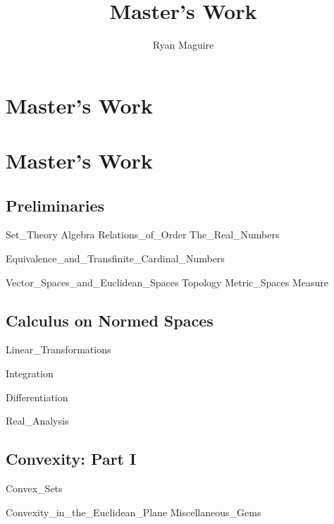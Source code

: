 \documentclass[crop=false,class=book,oneside]{standalone}
\begin{document}
    \newif\ifworkmasterswork
    \ifx\ifundergraduatemathematicswork\undefined
        \title{Master's Work}
        \author{Ryan Maguire}
        \date{\vspace{-5ex}}
        \maketitle
        \tableofcontents
        \clearpage
        \chapter*{Master's Work}
        \setcounter{chapter}{1}
    \else
        \chapter{Master's Work}
    \fi
    \section{Preliminaries}
        {Set_Theory}
        {Algebra}
        {Relations_of_Order}
        {The_Real_Numbers}
        
                  {Equivalence_and_Transfinite_Cardinal_Numbers}
        
                  {Vector_Spaces_and_Euclidean_Spaces}
        {Topology}
        {Metric_Spaces}
        {Measure}
    \section{Calculus on Normed Spaces}
        
                  {Linear_Transformations}
        
                  {Integration}
        
                  {Differentiation}
        
                  {Real_Analysis}
    \section{Convexity: Part I}
        {Convex_Sets}
        
                  {Convexity_in_the_Euclidean_Plane}
        {Miscellaneous_Gems}
\end{document}
